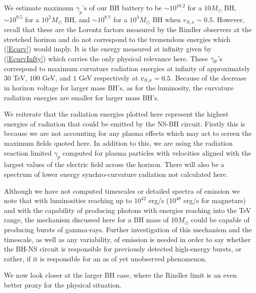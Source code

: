 We estimate maximum $\gamma_p$'s of our
BH battery to be $\sim 10^{10.2}$ for a $10M_\odot$
BH,  $\sim 10^{9.5}$ for a $10^2 M_\odot$ BH, and 
$\sim 10^{8.7}$ for a $10^3 M_\odot$ BH when $v_{S,x}\sim 0.5$. However, recall that these
are the Lorentz factors measured by the Rindler observers at the stretched horizon and do not correspond
to the tremendous energies which (\ref{Ecurv}) would imply. It is the energy measured at infinity given by (\ref{EcurvInfty}) which 
carries the only physical relevance here. 
These $\gamma_p$'s correspond to maximum curvature radiation energies at infinity of approximately $
30$ TeV, $100$ GeV, and $1$ GeV respectively at $v_{S, x}=0.5$. Because of the decrease in horizon voltage 
for larger mass BH's, as for the luminosity, the curvature radiation energies are smaller for 
larger mass BH's. 

We reiterate that the radiation energies plotted here represent the
highest energies of radiation that could be emitted by the NS-BH
circuit. Firstly this is because we are not accounting for any plasma 
effects which may act to screen the maximum fields quoted here. 
In addition to this, we are using the radiation reaction limited 
$\gamma_p$ computed for plasma particles with velocities aligned 
with the largest values of the electric field across the horizon. 
There will also be a spectrum of lower energy synchro-curvature 
radiation not calculated here.

Although we have not computed timescales or detailed spectra of
emission we note that with luminosities reaching up to $10^{42}$
erg/s ($10^{48}$ erg/s for magnetars) and with the capability of
producing photons with energies reaching into the TeV range, the
mechanism discussed here for a BH mass of  $10 M_{\odot}$ could be
capable of producing bursts of gamma-rays.
Further investigation of this mechanism and the
timescale, as well as any variability, of emission is needed in order
to say whether the BH-NS circuit is responsible for previously detected 
high-energy bursts, or rather, if it is responsible for an as of yet 
unobserved phenomenon.


We now look closer at the larger BH case, where the Rindler limit is an even better proxy for the physical situation.


